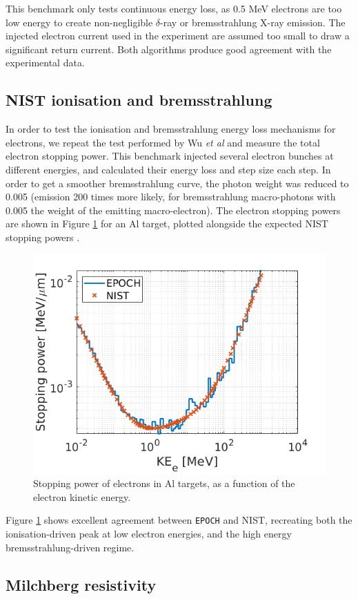 \documentclass[12pt]{article}
\numberwithin{equation}{section}
\begin{document}
This benchmark only tests continuous energy loss, as 0.5 MeV electrons are too low energy to create non-negligible $\delta$-ray or bremsstrahlung X-ray emission. The injected electron current used in the experiment are assumed too small to draw a significant return current. Both algorithms produce good agreement with the experimental data.

\subsection{NIST ionisation and bremsstrahlung} \label{sec:bench:NIST}

In order to test the ionisation and bremsstrahlung energy loss mechanisms for electrons, we repeat the test performed by Wu \textit{et al} \cite{bremPIC:Wu} and measure the total electron stopping power. This benchmark injected several electron bunches at different energies, and calculated their energy loss and step size each step. In order to get a smoother bremsstrahlung curve, the photon weight was reduced to 0.005 (emission 200 times more likely, for bremsstrahlung macro-photons with 0.005 the weight of the emitting macro-electron). The electron stopping powers are shown in Figure \ref{fig:bench:nist} for an Al target, plotted alongside the expected NIST stopping powers \cite{benchmark:Nist}. 

\begin{figure}
\centering
  \includegraphics[width=0.6\linewidth]{Figures/bench_NIST.png}
\caption{Stopping power of electrons in Al targets, as a function of the electron kinetic energy.}
\label{fig:bench:nist}
\end{figure}

Figure \ref{fig:bench:nist} shows excellent agreement between \texttt{EPOCH} and NIST, recreating both the ionisation-driven peak at low electron energies, and the high energy bremsstrahlung-driven regime.

\subsection{Milchberg resistivity} \label{sec:bench:Milchberg}
\end{document}

